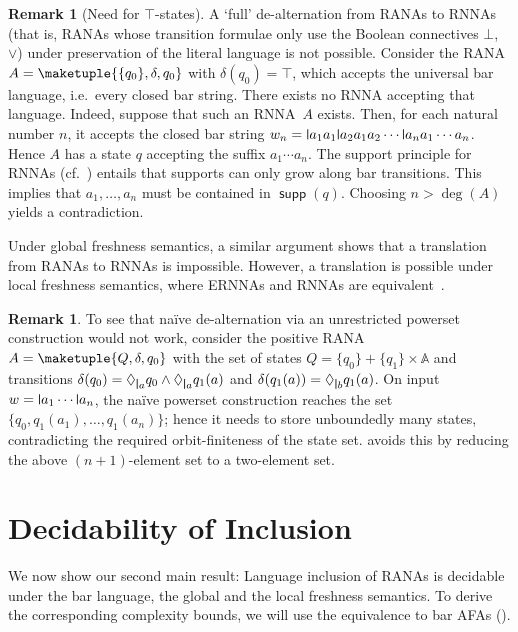 \documentclass[10pt,a4paper]{amsart}
\theoremstyle{definition}
\newtheorem{rem}[theo]{Remark}
\newcommand{\At}{\mathds{A}}
\DeclareMathOperator{\supp}{\mathsf{supp}}
\newcommand{\names}{\At}
\newcommand{\set}[1]{\{#1\}}
\newcommand{\midmid}{\hspace{0.2ex}{\rule[-0.1ex]{0.6pt}{1.65ex}}\hspace{0.2ex}}
\newcommand{\newletter}[1]{{\midmid}#1}
\begin{document}
\begin{rem}[Need for $\top$-states]%
A `full' de-alternation from RANAs to RNNAs (that is, RANAs whose transition formulae only use the Boolean connectives $\bot$, $\vee$) under preservation of the literal language is not possible. Consider the RANA $A = \maketuple{\set{q_0},\delta,q_0}$ with
    $\delta(q_0) = \top$, which accepts the universal bar language, i.e.~every closed bar string.
    There exists no RNNA accepting that language. Indeed, suppose that such an RNNA~$A$ exists.
    Then, for each natural number $n$, it accepts the closed bar string
    $w_n = \newletter{a_1}a_1\newletter{a_2}a_1a_2\cdots\newletter{a_n}a_1\cdots a_n$.
    Hence $A$ has a state $q$ accepting the suffix $a_1 \cdots a_n$. The support principle for RNNAs
    (cf.~\cite[Lemma~5.4]{skmw17}) entails that supports can only grow along bar transitions. This
    implies that $a_1, \dots, a_n$ must be contained in $\supp(q)$. Choosing $n>\deg(A)$ yields a contradiction.

    Under global freshness semantics, a similar argument shows that a translation from RANAs
    to RNNAs is impossible. However, a translation is possible under local freshness semantics,
    where ERNNAs and RNNAs are equivalent~\cite[Rem.~5.2]{hms21}. 
\end{rem}

\begin{rem}\label{rem:powerset}%
To see that naïve de-alternation via an unrestricted powerset construction would not work,
consider the positive RANA $A = \maketuple{Q, \delta, q_0}$ with the set of states $Q = \set{q_0} +
  \set{q_1} \times \names$ and transitions $\delta(q_0) = \Diamond_{\newletter a} q_0 \wedge \Diamond_{\newletter a} q_1(a)$ and $\delta(q_1(a)) = \Diamond_{\newletter b} q_1(a)$.
  On input $w = \newletter{a_1}\cdots\newletter{a_n}$, the naïve powerset construction reaches the set $\{q_0,q_1(a_1),\ldots, q_1(a_n)\}$; hence it needs to store unboundedly many states, contradicting the required orbit-finiteness of
  the state set.
   avoids this by reducing the above $(n+1)$-element set to a two-element set.
\end{rem}

\section{Decidability of Inclusion} \label{sec:decincl}

We now show our second main result:
Language inclusion of RANAs is decidable under the bar language, the global and the local freshness semantics.
To derive the corresponding complexity bounds, we will use the equivalence to bar AFAs ().
\end{document}
